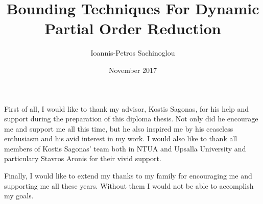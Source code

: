 \documentclass[diploma, english]{softlab-thesis}
\theoremstyle{definition}
\begin{document}

\frontmatter

\title{Bounding Techniques For Dynamic Partial Order Reduction}
\author{Ioannis-Petros Sachinoglou}
\date{November 2017}




\maketitle



\iffalse
\begin{abstractgr}%
  

  
\begin{keywordsgr}

\end{keywordsgr}
\end{abstractgr}
\fi

\begin{abstracten}%
  

  
\begin{keywordsen}

\end{keywordsen}
\end{abstracten}


\iffalse
\begin{acknowledgementsgr}
\end{acknowledgementsgr}
\fi

\begin{acknowledgementsen}

  First of all, I would like to thank my advisor, Kostis Sagonas, for his help and support during the preparation of this diploma thesis.
  Not only did he encourage me and support me all this time, but he also inspired me by his ceaseless enthusiasm and his avid interest in my
  work. I would also like to thank all members of Kostis Sagonas' team both in NTUA and Upsalla University and particulary Stavros Aronis for 
  their vivid support. 

  Finally, I would like to extend my thanks to my family for encouraging me and supporting me all these years. Without them I would not
  be able to accomplish my goals.
  
\end{acknowledgementsen}
\end{document}
